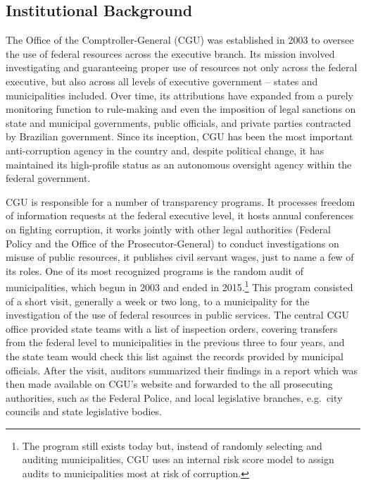 \documentclass[11pt]{article}
\begin{document}
\subsection{Institutional Background} \label{subsec:background_paper3}

The Office of the Comptroller-General (CGU) was established in 2003 to oversee the use of federal resources across the executive branch. Its mission involved investigating and guaranteeing proper use of resources not only across the federal executive, but also across all levels of executive government -- states and municipalities included. Over time, its attributions have expanded from a purely monitoring function to rule-making and even the imposition of legal sanctions on state and municipal governments, public officials, and private parties contracted by Brazilian government. Since its inception, CGU has been the most important anti-corruption agency in the country and, despite political change, it has maintained its high-profile status as an autonomous oversight agency within the federal government.

CGU is responsible for a number of transparency programs. It processes freedom of information requests at the federal executive level, it hosts annual conferences on fighting corruption, it works jointly with other legal authorities (Federal Policy and the Office of the Prosecutor-General) to conduct investigations on misuse of public resources, it publishes civil servant wages, just to name a few of its roles. One of its most recognized programs is the random audit of municipalities, which begun in 2003 and ended in 2015.\footnote{The program still exists today but, instead of randomly selecting and auditing municipalities, CGU uses an internal risk score model to assign audits to municipalities most at risk of corruption.} This program consisted of a short visit, generally a week or two long, to a municipality for the investigation of the use of federal resources in public services. The central CGU office provided state teams with a list of inspection orders, covering transfers from the federal level to municipalities in the previous three to four years, and the state team would check this list against the records provided by municipal officials. After the visit, auditors summarized their findings in a report which was then made available on CGU's website and forwarded to the all prosecuting authorities, such as the Federal Police, and local legislative branches, e.g.~city councils and state legislative bodies.
\end{document}

